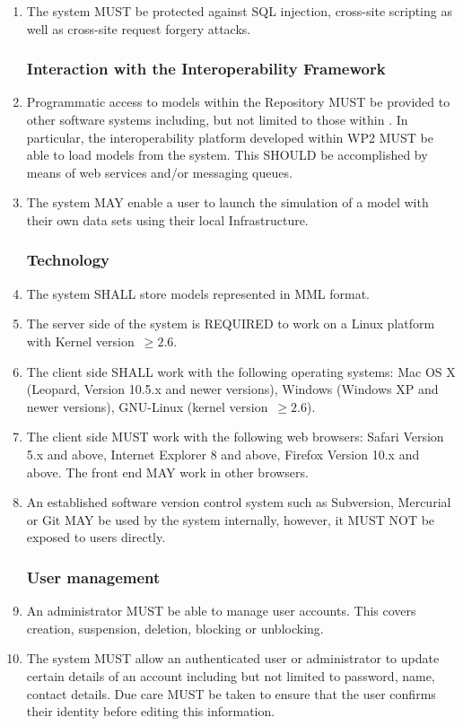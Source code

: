 \begin{enumerate}[1]
\item The system MUST be protected against SQL injection, cross-site scripting as well as cross-site request forgery attacks. 

\subsubsection{Interaction with the Interoperability Framework}
\item Programmatic access to models within the Repository MUST be provided to other software systems including, but not limited to those within \ddmore. In particular, the interoperability platform developed within WP2 MUST be able to load models from the system. This SHOULD be accomplished by means of web services and/or messaging queues. 

\item The system MAY enable a user to launch the simulation of a model with their own data sets using their local Infrastructure. 

\subsubsection{Technology}
\item The system SHALL store models represented in MML format.

\item The server side of the system is REQUIRED to work on a Linux platform with Kernel version~$\ge 2.6$. 

\item The client side SHALL work with the following operating systems: Mac OS X (Leopard, Version 10.5.x and newer versions), Windows (Windows XP and newer versions), GNU-Linux (kernel version~$\ge 2.6$).

\item The client side MUST work with the following web browsers: Safari Version 5.x and above, Internet Explorer 8 and above, Firefox Version 10.x and above. The front end MAY work in other browsers.

\item An established software version control system such as Subversion, Mercurial or Git MAY be used by the system internally, however, it MUST NOT be exposed to users directly.

\subsubsection{User management}
\item An administrator MUST be able to manage user accounts. This covers creation, suspension, deletion, blocking or unblocking.

\item The system MUST allow an authenticated user or administrator to update certain details of an account including but not limited to password, name, contact details. Due care MUST be taken to ensure that the user confirms their identity before editing this information.
\end{enumerate}

